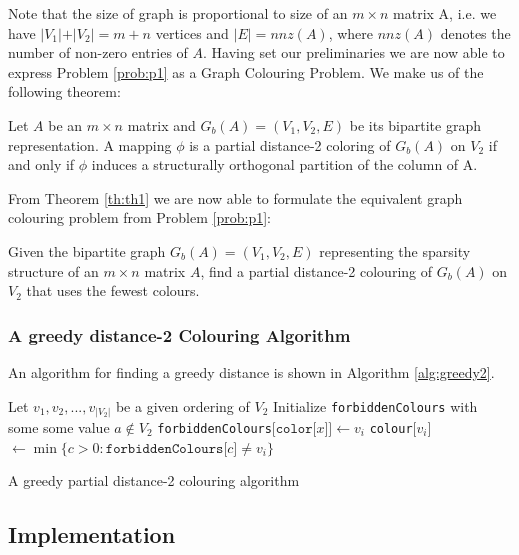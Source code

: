 Note that the size of graph is proportional to size of an $m \times n$ matrix A, i.e. we have $\vert V_1 \vert  + \vert V_2 \vert = m + n$ vertices and $\vert E \vert = nnz(A)$, where $nnz(A)$ denotes the number of non-zero entries of $A$. Having set our preliminaries we are now able to express Problem
\ref{prob:p1} as a Graph Colouring Problem. We make us of the following theorem:
\begin{theorem}
	Let $A$ be an $m \times n$ matrix and $G_b(A) = (V_1, V_2, E)$ be its bipartite graph representation. A mapping $\phi$ is a partial distance-2 coloring of $G_b(A)$ on $V_2$ if and only if $\phi$ induces a structurally orthogonal partition of the column of A. 
	\label{th:th1}
\end{theorem}
From Theorem \ref{th:th1} we are now able to formulate the equivalent graph colouring problem from Problem \ref{prob:p1}:
\begin{problem}
	Given the bipartite graph $G_b(A) = (V_1, V_2, E)$ representing the sparsity structure of an $m \times n$ matrix $A$, find a partial distance-2 colouring of $G_b(A)$ on $V_2$ that uses the fewest colours. 
\end{problem} 
\subsubsection{A greedy distance-2 Colouring Algorithm}
An algorithm for finding a greedy distance is shown in Algorithm \ref{alg:greedy2}.\newline 
\begin{algorithm}[H]
	\SetAlgoLined
	Let $v_1, v_2, ..., v_{\vert V_2 \vert}$ be a given ordering of $V_2$\;
	Initialize \texttt{forbiddenColours} with some some value $a \not\in V_2$\;
	{
		{
			{
				\texttt{forbiddenColours}$\lbrack \texttt{color} \lbrack x \rbrack \rbrack \leftarrow v_i$
    		}
	    }  
        \texttt{colour}$\lbrack v_i \rbrack$ $\leftarrow \min \{ c > 0 : \texttt{forbiddenColours}\lbrack c \rbrack \not= v_i \}$
    }	
	\caption{A greedy partial distance-2 colouring algorithm}
	\label{alg:greedy2}
\end{algorithm}




\subsection{Implementation}





